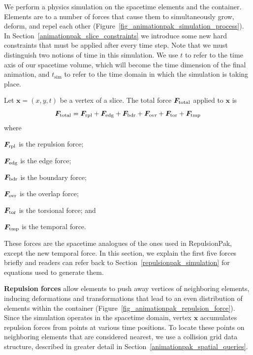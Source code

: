 \newtext
{
We perform a physics simulation on the spacetime elements and the 
container.  Elements are  to a number of forces that cause them
to simultaneously grow, deform, and repel each other (Figure~\ref{fig_animationpak_simulation_process}).
In Section~\ref{animationpak_slice_constraints} we introduce some new hard
constraints that must be applied after every time step.
Note that we must distinguish two notions of time in this simulation.  We use
$t$ to refer to the time axis of our spacetime volume, which will become
the time dimension of the final animation, and $t_\mathrm{sim}$ to
refer to the time domain in which the simulation is taking place.
}

\newtext
{
Let $\bm{x} = (x, y, t)$ be a vertex of a slice.
The total force $\bm{F}_\mathrm{total} $ applied to $\bm{x}$ is
\begin{equation}
\bm{F}_\mathrm{total}  = \bm{F}_\mathrm{rpl} + \bm{F}_\mathrm{edg} + \bm{F}_\mathrm{bdr} + \bm{F}_\mathrm{ovr} + \bm{F}_\mathrm{tor} + \bm{F}_\mathrm{tmp}
\end{equation}
where 
\begin{packeddescriptions}
  \item[$\bm{F}_\mathrm{rpl}$] is the repulsion force;
  \item[$\bm{F}_\mathrm{edg}$] is the edge force;
  \item[$\bm{F}_\mathrm{bdr}$] is the boundary force;
  \item[$\bm{F}_\mathrm{ovr}$] is the overlap force;
  \item[$\bm{F}_\mathrm{tor}$] is the torsional force; and 
  \item[$\bm{F}_\mathrm{tmp}$] is the temporal force.  
\end{packeddescriptions}
These forces are the spacetime analogues of the ones used in RepulsionPak, except the new temporal force.
In this section, we explain the first five forces briefly 
and readers can refer back to Section~\ref{repulsionpak_simulation}
for equations used to generate them.
}



\newtext
{
\textbf{Repulsion forces} allow elements to push away vertices of 
neighboring elements, inducing deformations and transformations that lead 
to an even distribution of elements within the container
(Figure~\ref{fig_animationpak_repulsion_force}).
Since the simulation operates in the spacetime domain,
vertex $\bm{x}$ accumulates repulsion forces from points at
various time positions.
To locate these points on neighboring elements that are considered 
nearest, we use a collision grid data structure, described in greater
detail in Section~\ref{animationpak_spatial_queries}.
}


